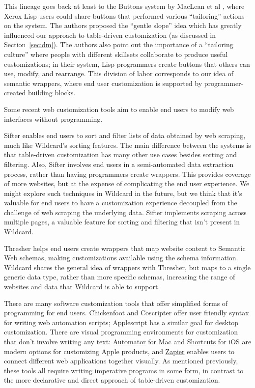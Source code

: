 \documentclass[sigplan,screen,10pt,anonymous,review]{acmart}
\begin{document}
This lineage goes back at least to the Buttons system by MacLean et al
\citep{maclean1990}, where Xerox Lisp users could share buttons that
performed various ``tailoring'' actions on the system. The authors
proposed the ``gentle slope'' idea which has greatly influenced our
approach to table-driven customization (as discussed in
Section~\ref{sec:dm}). The authors also point out the importance of a
``tailoring culture'' where people with different skillsets collaborate
to produce useful customizations; in their system, Lisp programmers
create buttons that others can use, modify, and rearrange. This division
of labor corresponds to our idea of semantic wrappers, where end user
customization is supported by programmer-created building blocks.

Some recent web customization tools aim to enable end users to modify
web interfaces without programming.

Sifter \citep{huynh2006} enables end users to sort and filter lists of
data obtained by web scraping, much like Wildcard's sorting features.
The main difference between the systems is that table-driven
customization has many other use cases besides sorting and filtering.
Also, Sifter involves end users in a semi-automated data extraction
process, rather than having programmers create wrappers. This provides
coverage of more websites, but at the expense of complicating the end
user experience. We might explore such techniques in Wildcard in the
future, but we think that it's valuable for end users to have a
customization experience decoupled from the challenge of web scraping
the underlying data. Sifter implements scraping across multiple pages, a
valuable feature for sorting and filtering that isn't present in
Wildcard.

Thresher \citep{hogue2005} helps end users create wrappers that map
website content to Semantic Web schemas, making customizations available
using the schema information. Wildcard shares the general idea of
wrappers with Thresher, but maps to a single generic data type, rather
than more specific schemas, increasing the range of websites and data
that Wildcard is able to support.

There are many software customization tools that offer simplified forms
of programming for end users. Chickenfoot \citep{bolin2005} and
Coscripter \citep{leshed2008} offer user friendly syntax for writing web
automation scripts; Applescript \citep{cook2007} has a similar goal for
desktop customization. There are visual programming environments for
customization that don't involve writing any text:
\href{https://support.apple.com/guide/automator/welcome/mac}{Automator}
for Mac and
\href{https://apps.apple.com/us/app/shortcuts/id915249334}{Shortcuts}
for iOS are modern options for customizing Apple products, and
\href{https://zapier.com/}{Zapier} enables users to connect different
web applications together visually. As mentioned previously, these tools
all require writing imperative programs in some form, in contrast to the
more declarative and direct approach of table-driven customization.
\end{document}

